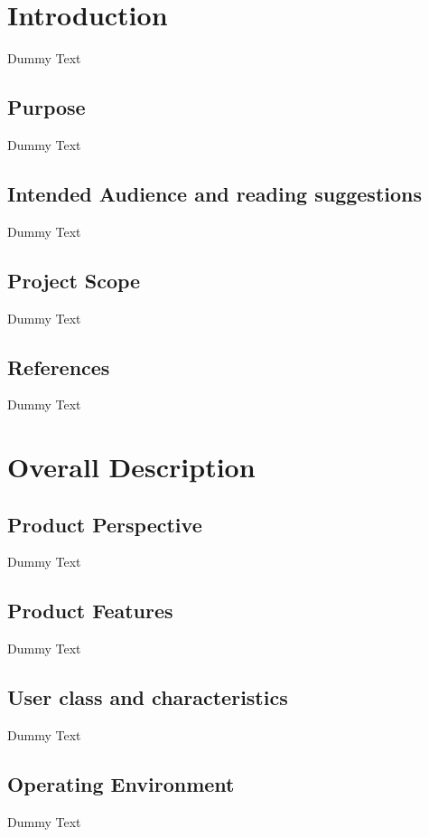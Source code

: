 \documentclass{article}
\begin{document}
\tableofcontents

\newpage

\section{Introduction}
Dummy Text
\subsection{Purpose}
Dummy Text
\subsection{Intended Audience and reading suggestions}
Dummy Text
\subsection{Project Scope}
Dummy Text
\subsection{References}
Dummy Text

\section{Overall Description}
\subsection{Product Perspective}
Dummy Text
\subsection{Product Features}
Dummy Text
\subsection{User class and characteristics}
Dummy Text
\subsection{Operating Environment}
Dummy Text
\end{document}
